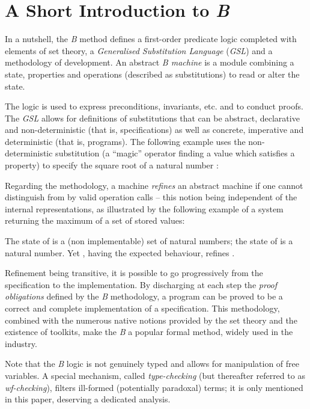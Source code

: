 \documentclass{llncs}
\begin{document}
\section{A Short Introduction to \emph{B}}\label{sc_introb}

In a nutshell, the \emph{B} method defines a first-order predicate logic completed with 
elements of set theory, a \emph{Generalised Substitution Language} (\emph{GSL}) and a 
methodology of development. An abstract \emph{B machine} is a module combining a state, 
properties and operations (described as substitutions) to read or alter the state.

The logic is used to express preconditions, invariants, etc. and to conduct proofs. The 
\emph{GSL} allows for definitions of substitutions that can be abstract, declarative and 
non-deterministic (that is, specifications) as well as concrete, imperative and deterministic 
(that is, programs). The following example uses the non-deterministic substitution 
 (a ``magic'' operator finding a value which satisfies a property) to specify the 
square root of a natural number :
\begin{example}\small
\end{example}

Regarding the methodology, a machine  \emph{refines} an abstract machine  if one 
cannot distinguish  from  by valid operation calls -- this notion being independent 
of the internal representations, as illustrated by the following example of a system returning 
the maximum of a set of stored values:
\begin{example}\small The state of  is a (non implementable) set of natural numbers; the 
state of  is a natural number. Yet , having the expected behaviour, refines .

\end{example}
Refinement being transitive, it is possible to go progressively from the specification to the 
implementation. By discharging at each step the \emph{proof obligations} defined by the 
\emph{B} methodology, a program can be proved to be a correct and complete implementation of a 
specification. This methodology, combined with the numerous native notions provided by the set 
theory and the existence of toolkits, make the \emph{B} a popular formal method, widely used 
in the industry.

Note that the \emph{B} logic is not genuinely typed and allows for manipulation of free 
variables. A special mechanism, called \emph{type-checking} (but thereafter referred to as 
\emph{wf-checking}), filters ill-formed (potentially paradoxal) terms; it is only mentioned 
in this paper, deserving a dedicated analysis.
\end{document}
